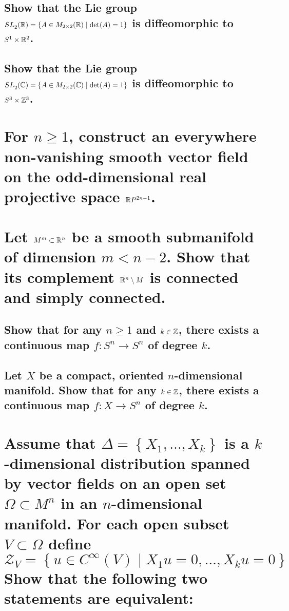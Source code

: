 \documentclass[10pt]{article}
\begin{document}
 

\advsection{}

\subsection{Show that the Lie group $SL^{}_{2}(\mathbb{R}) = \left\{ A \in M_{2 \times2}(\mathbb{R})
    \mid\det (A) = 1 \right\} $ is diffeomorphic to $S^1 \times \mathbb{R}^2$.}

\subsection{Show that the Lie group $SL^{}_{2}(\mathbb{C}) = \left\{ A \in M_{2 \times 2} (\mathbb{C})
    \mid \det (A)= 1 \right\} $ is diffeomorphic to $S^3 \times \mathbb{Z}^3$.}

\section{For $n \geq 1 $, construct an everywhere non-vanishing smooth vector field on the
  odd-dimensional real projective space $\mathbb{R} P^{2n-1}$.}

\section{Let $M^m \subset \mathbb{R}^n$ be a smooth submanifold of dimension $m < n-2$. Show that
  its complement $\mathbb{R}^n \setminus M$ is connected and simply connected.}

\advsection{}

\subsection{Show that for any $n \geq 1$ and $k \in \mathbb{Z}$, there exists a continuous map $f:
  S^n \to S^n$ of degree $k$.}

\subsection{Let $X$ be a compact, oriented $n$-dimensional manifold. Show that for any $k \in \mathbb{Z}$, there
  exists a continuous map $f : X \to S^n$ of degree $k$.}

\section{Assume that $\Delta = \left\{ X_1, \dots, X_k \right\} $ is a $k$-dimensional distribution
  spanned by vector fields on an open set $\Omega \subset M^n$ in an $n$-dimensional manifold. For
  each open subset $V \subset \Omega$ define
  $$ \mathcal{Z}_V = \left\{ u \in C^\infty (V) \mid X_1 u = 0, \dots, X_k u =0 \right\} $$
  Show that the following two statements are equivalent:}
\end{document}
